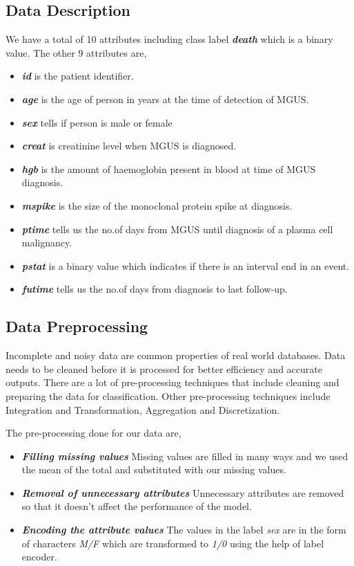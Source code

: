 \documentclass[conference]{IEEEtran}
\begin{document}
\subsection{Data Description}
\label{ssec:describe}
We have a total of 10 attributes including class label \textbf{\textit{death}} which is a binary value. The other 9 attributes are,

\begin{itemize}
\item \textbf{\textit{id}} is the patient identifier.
\item \textbf{\textit{age}} is the age of person in years at the time of detection of MGUS.
\item \textbf{\textit{sex}} tells if person is male or female
\item \textbf{\textit{creat}} is creatinine level when MGUS is diagnosed.
\item \textbf{\textit{hgb}} is the amount of haemoglobin present in blood at time of MGUS diagnosis.
\item \textbf{\textit{mspike}} is the size of the monoclonal protein spike at diagnosis.
\item \textbf{\textit{ptime}} tells us the no.of days from MGUS until diagnosis of a plasma cell malignancy.
\item \textbf{\textit{pstat}} is a binary value which indicates if there is an interval end in an event.
\item \textbf{\textit{futime}} tells us the no.of days from diagnosis to last follow-up.
\end{itemize}


\subsection{Data Preprocessing}
\label{ssec:preprocess}
Incomplete and noisy data are common properties of real world databases. Data needs to be cleaned before it is processed for better efficiency and accurate outputs. There are a lot of pre-processing techniques that include cleaning and preparing the data for classification. Other pre-processing techniques include Integration and Transformation, Aggregation and Discretization.

The pre-processing done for our data are,
\begin{itemize}
\item \textbf{\textit{Filling missing values}} Missing values are filled in many ways and we used the mean of the total and substituted with our missing values.
\item \textbf{\textit{Removal of unnecessary attributes}} Unnecessary attributes are removed so that it doesn't affect the performance of the model.
\item \textbf{\textit{Encoding the attribute values}} The values in the label \textit{sex} are in the form of characters \textit{M/F} which are transformed to \textit{1/0} using the help of label encoder.
\end{itemize}
\end{document}
